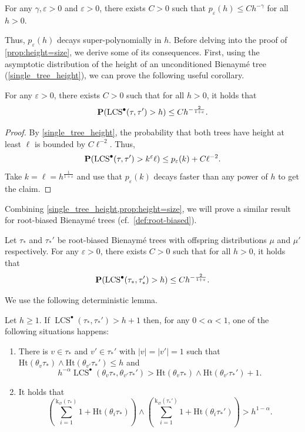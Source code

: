 \documentclass[11pt,reqno]{amsart}
\newcommand{\Ht}{\mathrm{Ht}}
\newcommand{\rk}{\mathrm{k}}
\newcommand{\LCS}{\operatorname{LCS}}
\newcommand{\eps}{\varepsilon}
\begin{document}
\begin{prop}\label{prop:height=size}
  For any $\gamma,\eps > 0$ and $\eps > 0$, there exists $C > 0$ such that $p_\eps(h) \leq Ch^{-\gamma}$ for all $h > 0$.
\end{prop}

Thus, $p_\eps(h)$ decays super-polynomially in $h$.
Before delving into the proof of \cref{prop:height=size}, we derive some of its consequences.
First, using the asymptotic distribution of the height of an unconditioned Bienaym\'{e} tree (\cref{single_tree_height}), we can prove the following useful corollary.

\begin{cor}\label{cor:LCS-tail}
  For any $\eps > 0$, there exists $C > 0$ such that for all $h>0$, it holds that 
  \[
    \P(\LCS^\bullet(\tau,\tau') > h) \leq C h^{-\frac{2}{1+\e}}.
  \]
\end{cor}

\begin{proof}
  By \cref{single_tree_height}, the probability that both trees have height at least $\ell$ is bounded by $C\ell^{-2}$.
  Thus,
  \[
    \P(\LCS^\bullet(\tau,\tau') > k^\eps \ell) \leq p_\eps(k) + C\ell^{-2}.
  \]
  Take $k=\ell=h^{\frac{1}{1+\eps}}$ and use that $p_\eps(k)$ decays faster than any power of $h$ to get the claim.
\end{proof}

Combining \cref{single_tree_height,prop:height=size}, we will prove a similar result for root-biased Bienaym\'{e} trees (cf.~\cref{def:root-biased}).

\begin{prop}\label{prop:LCS_sb_tail}
  Let $\tau_*$ and $\tau_*'$ be root-biased Bienaym\'{e} trees with offspring distributions $\mu$ and $\mu'$ respectively. For any $\eps>0$, there exists $C>0$ such that for all $h>0$, it holds that 
  \[
    \prob(\LCS^\bullet(\tau_*,\tau_*') > h) \leq C h^{-\frac{2}{1+\e}}.
  \]
\end{prop}

We use the following deterministic lemma. 

\begin{lem}\label{lem:cases_sb}
    Let $h\geq 1$. If $\LCS^\bullet(\tau_*,\tau_*') > h+1$ then, for any $0<\alpha<1$, one of the following situations happens: 
    \begin{enumerate}
        \item[\emph{(i)}] There is $v\in \tau_*$ and $v'\in \tau_*'$ with $|v|=|v'|=1$ such that $\Ht(\theta_v\tau_*)\wedge \Ht(\theta_{v'}\tau_*')\le h$ and \[h^{-\alpha}\LCS^\bullet(\theta_v\tau_*,\theta_{v'}\tau_*')> \Ht(\theta_v\tau_*)\wedge \Ht(\theta_{v'}\tau_*') +1.\] 
        \item[\emph{(ii)}] It holds that 
        \[\left(\sum_{i=1}^{\rk_\varnothing(\tau_*)}1+\Ht(\theta_i\tau_*)\right)\wedge \left(\sum_{i=1}^{\rk_\varnothing(\tau_*')}1+\Ht(\theta_i\tau_*')\right)>h^{1-\alpha}.\]
    \end{enumerate}
\end{lem}
\end{document}
